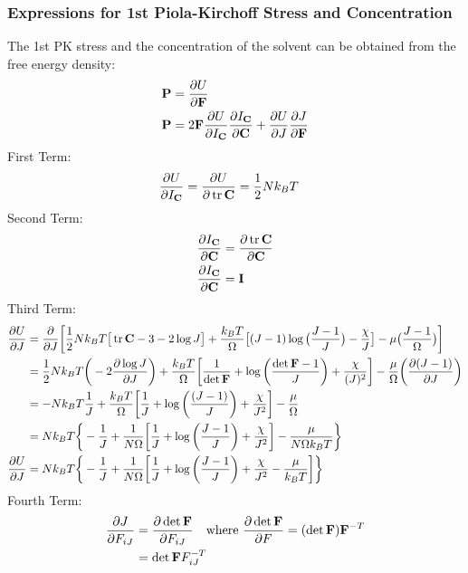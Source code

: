 \documentclass[12pt,3p]{article}
\numberwithin{equation}{section}
\begin{document}
\subsubsection{Expressions for 1st Piola-Kirchoff Stress and Concentration}
\vspace{-1ex}
The 1st PK stress and the concentration of the solvent can be obtained from the free energy density: 
\begin{align*}
\mathbf{P} 
	&= \pdv{U}{\mathbf{F}} \\
\mathbf{P} 
	&=  2 \mathbf{F} \pdv{{U}}{I_\mathbf{C}} \pdv{I_\mathbf{C}}{\mathbf{C}} 
	+ \pdv{U}{J} \pdv{J}{\mathbf{F}} 
\end{align*}
First Term:
\begin{align*}
\pdv{U}{I_\mathbf{C}} &= \pdv{U}{\tr \mathbf{C}} = \frac{1}{2} N k_B T 
\end{align*}
Second Term:
\begin{align*}
\pdv{I_\mathbf{C}}{\mathbf{C}} &= \pdv{\tr \mathbf{C}}{\mathbf{C}} \\
\pdv{I_\mathbf{C}}{\mathbf{C}} &= \mathbf{I}
\end{align*}
Third Term:
\begin{align*}
\pdv{U}{J} 
	&= \pdv{}{J} \bigg[ \frac{1}{2} N k_B T \big[\tr \mathbf{C} - 3 - 2 \log J \big] + \frac{k_B T}{\Omega} \big[ (J - 1) \log \big( \frac{J - 1}{J} \big) - \frac{\chi}{J} \big] - \mu \big(\frac{J - 1}{\Omega} \big) \bigg] \\
	&= \frac{1}{2} N k_B T \bigg(-2 \pdv{\log J}{J} \bigg) 
	+ \frac{k_B T}{\Omega} \bigg[ \frac{1}{\det \mathbf{F}} 
	+ \log \bigg( \frac{\det \mathbf{F} - 1}{J} \bigg) 
	+ \frac{\chi}{(J)^2} \bigg] 
	- \frac{\mu}{\Omega} \bigg( \pdv{(J-1)}{J} \bigg)\\
	&= - N k_B T \frac{1}{J} 
	+ \frac{k_B T}{\Omega} \bigg[ \frac{1}{J} + \log \bigg( \frac{(J - 1)}{J} \bigg) + \frac{\chi}{J^2} \bigg] 
	- \frac{\mu}{\Omega} \\
	&= N k_B T \bigg\{- \frac{1}{J} 
	+ \frac{1}{N \Omega} \bigg[ \frac{1}{J} + \log \bigg( \frac{J - 1}{J} \bigg) + \frac{\chi}{J^2} \bigg] - \frac{\mu}{N \Omega k_B T} \bigg\} \\
\pdv{U}{J} 
	&= N k_B T \bigg\{- \frac{1}{J} + \frac{1}{N \Omega} \bigg[ \frac{1}{J} + \log \bigg( \frac{J - 1}{J} \bigg) + \frac{\chi}{J^2} - \frac{\mu}{k_B T} \bigg] \bigg\} 
\end{align*}
Fourth Term: 
\begin{align*}
\pdv{J}{F_{iJ}} &= \pdv{\det \mathbf{F}}{F_{iJ}} \quad \text{where } \pdv{\det \mathbf{F}}{F} = (\det \mathbf{F}) \mathbf{F}^{-T} \\
			&= \det \mathbf{F} F_{iJ}^{-T}
\end{align*}
\end{document}
